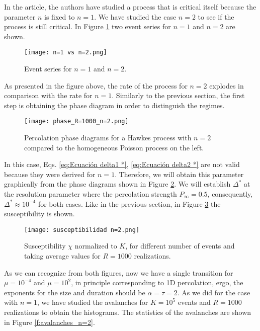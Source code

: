 In the article, the authors have studied a process that is critical itself because the parameter $n$ is fixed to $n=1$. We have studied the case $n=2$ to see if the process is still critical. 
In Figure \ref{f:n=1 vs n=2} two event series for $n=1$ and $n=2$ are shown. 

\begin{figure}[H]
    \centering
    \texttt{[image: n=1 vs n=2.png]}
    \caption{Event series for $n=1$ and $n=2$.}
    \label{f:n=1 vs n=2}
\end{figure}

As presented in the figure above, the rate of the process for $n=2$ explodes in comparison with the rate for $n=1$. 
Similarly to the previous section, the first step is obtaining the phase diagram in order to distinguish the regimes. 

\begin{figure}[H]
    \centering
    \texttt{[image: phase\_R=1000\_n=2.png]}
    \caption{Percolation phase diagrams for a Hawkes process with $n=2$ compared to the homogeneous Poisson process on the left.}
    \label{f:phase_diagram_n=2}
\end{figure}
In this case, Eqs. \ref{eq:Ecuación delta1 *},  \ref{eq:Ecuación delta2 *} are not valid because they were derived for $n=1$. 
Therefore, we will obtain this parameter graphically from the phase diagrams shown in Figure \ref{f:phase_diagram_n=2}. We will establish $\Delta^*$ at the resolution parameter where the
percolation strength $P_{\infty} = 0.5$, consequently, $\Delta^*\approx 10^{-4}$ for both cases. Like in the previous section, in Figure \ref{f:susceptibilidad_n=2} the susceptibility is shown.

\begin{figure}[H]
    \centering
    \texttt{[image: susceptibilidad n=2.png]}
    \caption{Susceptibility $\chi$ normalized to $K$, for different number of events and taking average values for $R=1000$ realizations.}
    \label{f:susceptibilidad_n=2}
\end{figure}


As we can recognize from both figures, now we have a single transition for $\mu=10^{-4}$ and $\mu=10^2$, in principle corresponding to 1D percolation, ergo, 
the exponents for the size and duration should be $\alpha=\tau=2$. As we did for the case with $n=1$, we have studied the avalanches for $K=10^5$ events and $R=1000$ realizations to 
obtain the histograms. The statistics of the avalanches are shown in Figure \ref{f:avalanches_n=2}.

